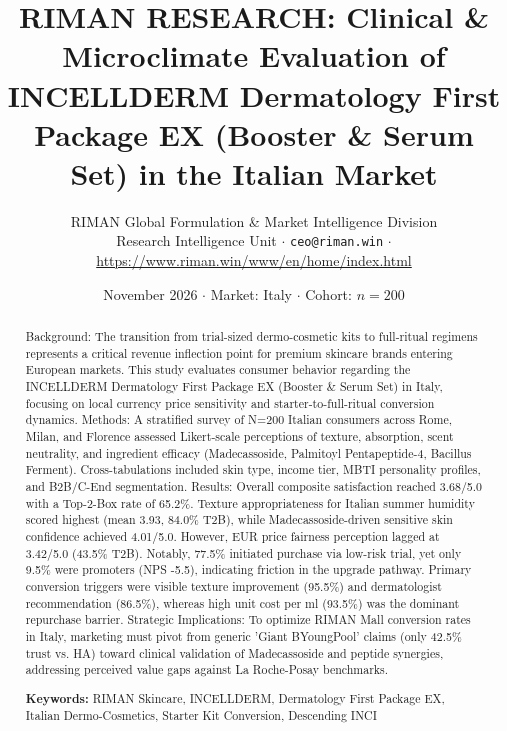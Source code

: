 \documentclass[10pt,twocolumn,a4paper]{article}
\title{\textbf{RIMAN RESEARCH: Clinical \& Microclimate Evaluation of INCELLDERM Dermatology First Package EX (Booster \& Serum Set) in the Italian Market}}
\author{RIMAN Global Formulation \& Market Intelligence Division\\
\small Research Intelligence Unit $\cdot$ \texttt{ceo@riman.win} $\cdot$ \url{https://www.riman.win/www/en/home/index.html}}
\date{November 2026 \quad $\cdot$ \quad Market: Italy \quad $\cdot$ \quad Cohort: $n = 200$}
\begin{document}
\maketitle

\begin{abstract}
Background: The transition from trial-sized dermo-cosmetic kits to full-ritual regimens represents a critical revenue inflection point for premium skincare brands entering European markets. This study evaluates consumer behavior regarding the INCELLDERM Dermatology First Package EX (Booster \& Serum Set) in Italy, focusing on local currency price sensitivity and starter-to-full-ritual conversion dynamics. Methods: A stratified survey of N=200 Italian consumers across Rome, Milan, and Florence assessed Likert-scale perceptions of texture, absorption, scent neutrality, and ingredient efficacy (Madecassoside, Palmitoyl Pentapeptide-4, Bacillus Ferment). Cross-tabulations included skin type, income tier, MBTI personality profiles, and B2B/C-End segmentation. Results: Overall composite satisfaction reached 3.68/5.0 with a Top-2-Box rate of 65.2\%. Texture appropriateness for Italian summer humidity scored highest (mean 3.93, 84.0\% T2B), while Madecassoside-driven sensitive skin confidence achieved 4.01/5.0. However, EUR price fairness perception lagged at 3.42/5.0 (43.5\% T2B). Notably, 77.5\% initiated purchase via low-risk trial, yet only 9.5\% were promoters (NPS -5.5), indicating friction in the upgrade pathway. Primary conversion triggers were visible texture improvement (95.5\%) and dermatologist recommendation (86.5\%), whereas high unit cost per ml (93.5\%) was the dominant repurchase barrier. Strategic Implications: To optimize RIMAN Mall conversion rates in Italy, marketing must pivot from generic 'Giant BYoungPool' claims (only 42.5\% trust vs. HA) toward clinical validation of Madecassoside and peptide synergies, addressing perceived value gaps against La Roche-Posay benchmarks.

\vspace{0.4em}
\noindent\textbf{Keywords:} RIMAN Skincare, INCELLDERM, Dermatology First Package EX, Italian Dermo-Cosmetics, Starter Kit Conversion, Descending INCI
\end{abstract}
\end{document}
